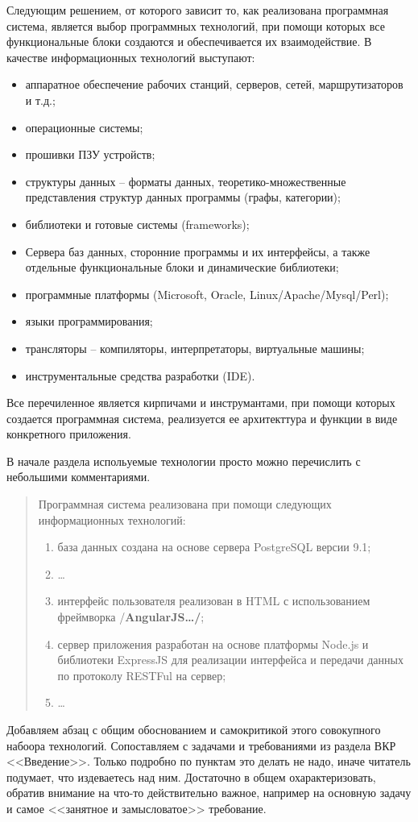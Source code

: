 \documentclass[a4paper,14pt,final]{extreport}
\newcommand{\aaa}[1]{{/\bfseries #1\ldots/}}
\begin{document}
Следующим решением, от которого зависит то, как реализована программная система, является выбор программных технологий, при помощи которых все функциональные блоки создаются и обеспечивается их взаимодействие.  В качестве информационных технологий выступают:
\begin{itemize}
\item аппаратное обеспечение рабочих станций, серверов, сетей, маршрутизаторов и т.д.;
\item операционные системы;
\item прошивки ПЗУ устройств;
\item структуры данных -- форматы данных, теоретико-множественные представления структур данных программы (графы, категории);
\item библиотеки и готовые системы (frameworks);
\item Сервера баз данных, сторонние программы и их интерфейсы, а также отдельные функциональные блоки и динамические библиотеки;
\item программные платформы (Microsoft, Oracle, Linux/Apache/Mysql/Perl);
\item языки программирования;
\item трансляторы -- компиляторы, интерпретаторы, виртуальные машины;
\item инструментальные средства разработки (IDE).
\end{itemize}
Все перечиленное является кирпичами и инструмантами, при помощи которых создается программная система, реализуется ее архитекттура и функции в виде конкретного приложения.

В начале раздела испольуемые технологии просто можно перечислить с небольшими комментариями.
\begin{quote}
  Программная система реализована при помощи следующих информационных технологий:
  \begin{enumerate}
  \item база данных создана на основе сервера PostgreSQL версии 9.1;
  \item \ldots{}
  \item интерфейс пользователя реализован в HTML с использованием фреймворка \aaa{AngularJS};
  \item сервер приложения разработан на основе платформы Node.js и библиотеки ExpressJS для реализации интерфейса и передачи данных по протоколу RESTFul на сервер;
  \item \ldots{}
  \end{enumerate}
\end{quote}
Добавляем абзац с общим обоснованием и самокритикой этого совокупного набоора технологий.  Сопоставляем с задачами и требованиями из раздела ВКР <<Введение>>.  Только подробно по пунктам это делать не надо, иначе читатель подумает, что издеваетесь над ним.  Достаточно в общем охарактеризовать, обратив внимание на что-то действительно важное, например на основную задачу и самое <<занятное и замысловатое>> требование.
\end{document}
